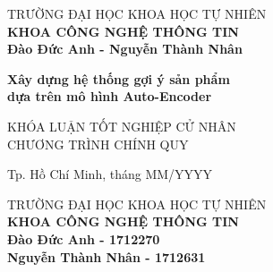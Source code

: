 \begin{titlepage}

\begin{center}
TRƯỜNG ĐẠI HỌC KHOA HỌC TỰ NHIÊN\\
\textbf{KHOA CÔNG NGHỆ THÔNG TIN}\\[2cm]


{ \Large \bfseries Đào Đức Anh - Nguyễn Thành Nhân\\[2cm] } 


{ \Large \bfseries  Xây dựng hệ thống gợi ý sản phẩm\\dựa trên mô hình Auto-Encoder \\[3cm]} 


\large KHÓA LUẬN TỐT NGHIỆP CỬ NHÂN\\
\large CHƯƠNG TRÌNH CHÍNH QUY\\



\vfill
Tp. Hồ Chí Minh, tháng MM/YYYY

\end{center}

\pagebreak



\begin{center}

TRƯỜNG ĐẠI HỌC KHOA HỌC TỰ NHIÊN\\
\textbf{KHOA CÔNG NGHỆ THÔNG TIN}\\[2cm]


{\large \bfseries Đào Đức Anh - 1712270\\} 
{\large \bfseries Nguyễn Thành Nhân - 1712631\\[2cm]}



\end{center}
\end{titlepage}
